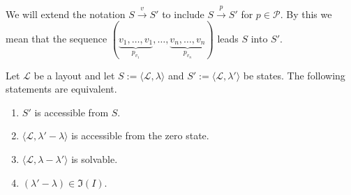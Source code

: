 \begin{remark}
	We will extend the notation $S\overset{v}{\rightarrow}S'$ to include
	$S\overset{p}{\rightarrow}S'$ for $p\in\mathcal{P}$. By this we mean 
	that the sequence $(\underset{p_{v_{1}}}{\underbrace{v_{1},\ldots,v_{1}}},
	\ldots ,\underset{p_{v_{n}}}{\underbrace{v_{n},\ldots,v_{n}}})$ leads $S$
	into $S'$.
\end{remark}

\begin{theorem}\label{theorem:equivalence}
	Let $\mathcal{L}$ be a layout and let
	$S:=\langle\mathcal{L},\lambda\rangle$ and
	$S':=\langle\mathcal{L},\lambda'\rangle$ be states. The following
	statements are equivalent.
	\begin{enumerate}
		\item\label{layout:equivalent:A} $S'$ is accessible from $S$.
		\item\label{layout:equivalent:B} $\langle\mathcal{L},
		\lambda'-\lambda\rangle$ is accessible from the zero state.
		\item\label{layout:equivalent:C} $\langle\mathcal{L},
		\lambda-\lambda'\rangle$ is solvable. 
		\item\label{layout:equivalent:D} $(\lambda'-\lambda)\in\Im(I)$.
	\end{enumerate}
\end{theorem}

